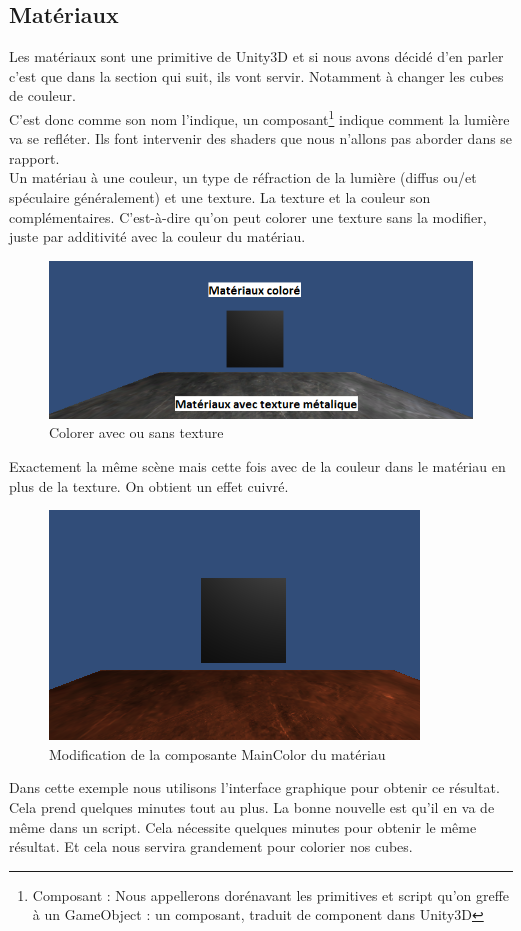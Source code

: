 \documentclass[a4paper,11pt]{myreport}
\begin{document}
	\subsection{Matériaux}
	\par Les matériaux sont une primitive de Unity3D et si nous avons décidé d'en parler c'est que dans la section qui suit, ils vont servir. Notamment à changer les cubes de couleur.\\
	C'est donc comme son nom l'indique, un composant\footnote{Composant : Nous appellerons dorénavant les primitives et script qu'on greffe à un GameObject : un composant, traduit de component dans Unity3D} indique comment la lumière va se refléter. Ils font intervenir des shaders que nous n'allons pas aborder dans se rapport.\\
	Un matériau à une couleur, un type de réfraction de la lumière (diffus ou/et spéculaire généralement) et une texture. La texture et la couleur son complémentaires. C'est-à-dire qu'on peut colorer une texture sans la modifier, juste par additivité avec la couleur du matériau.
	\begin{figure}[h]
	\includegraphics[scale=0.50]{./images/materiaux.png}
	\caption{Colorer avec ou sans texture}
	\end{figure}
	\par Exactement la même scène mais cette fois avec de la couleur dans le matériau en plus de la texture. On obtient un effet cuivré.
	\begin{figure}[h]
	\includegraphics[scale=0.40]{./images/materiaux_cuivre.png}
	\caption{Modification de la composante MainColor du matériau}
	\end{figure}
	\par Dans cette exemple nous utilisons l'interface graphique pour obtenir ce résultat. Cela prend quelques minutes tout au plus. La bonne nouvelle est qu'il en va de même dans un script. Cela nécessite quelques minutes pour obtenir le même résultat. Et cela nous servira grandement pour colorier nos cubes.
	\newpage
\end{document}
